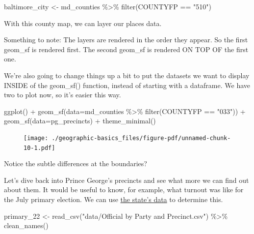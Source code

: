 \documentclass[
  letterpaper,
  DIV=11,
  numbers=noendperiod]{scrreprt}
\newenvironment{Shaded}{\begin{snugshade}}{\end{snugshade}}
\newcommand{\AttributeTok}[1]{\textcolor[rgb]{0.40,0.45,0.13}{#1}}
\newcommand{\FunctionTok}[1]{\textcolor[rgb]{0.28,0.35,0.67}{#1}}
\newcommand{\NormalTok}[1]{\textcolor[rgb]{0.00,0.23,0.31}{#1}}
\newcommand{\OtherTok}[1]{\textcolor[rgb]{0.00,0.23,0.31}{#1}}
\newcommand{\SpecialCharTok}[1]{\textcolor[rgb]{0.37,0.37,0.37}{#1}}
\newcommand{\StringTok}[1]{\textcolor[rgb]{0.13,0.47,0.30}{#1}}
\begin{document}
\begin{Shaded}
\begin{Highlighting}[]
\NormalTok{baltimore\_city }\OtherTok{\textless{}{-}}\NormalTok{ md\_counties }\SpecialCharTok{\%\textgreater{}\%}
  \FunctionTok{filter}\NormalTok{(COUNTYFP }\SpecialCharTok{==} \StringTok{"510"}\NormalTok{)}
\end{Highlighting}
\end{Shaded}

With this county map, we can layer our places data.

Something to note: The layers are rendered in the order they appear. So
the first geom\_sf is rendered first. The second geom\_sf is rendered ON
TOP OF the first one.

We're also going to change things up a bit to put the datasets we want
to display INSIDE of the geom\_sf() function, instead of starting with a
dataframe. We have two to plot now, so it's easier this way.

\begin{Shaded}
\begin{Highlighting}[]
\FunctionTok{ggplot}\NormalTok{() }\SpecialCharTok{+}
  \FunctionTok{geom\_sf}\NormalTok{(}\AttributeTok{data=}\NormalTok{md\_counties }\SpecialCharTok{\%\textgreater{}\%} \FunctionTok{filter}\NormalTok{(COUNTYFP }\SpecialCharTok{==} \StringTok{"033"}\NormalTok{)) }\SpecialCharTok{+}
  \FunctionTok{geom\_sf}\NormalTok{(}\AttributeTok{data=}\NormalTok{pg\_precincts) }\SpecialCharTok{+}
  \FunctionTok{theme\_minimal}\NormalTok{()}
\end{Highlighting}
\end{Shaded}

\begin{figure}[H]

{\centering \texttt{[image: ./geographic-basics\_files/figure-pdf/unnamed-chunk-10-1.pdf]}

}

\end{figure}

Notice the subtle differences at the boundaries?

Let's dive back into Prince George's precincts and see what more we can
find out about them. It would be useful to know, for example, what
turnout was like for the July primary election. We can use
\href{https://elections.maryland.gov/press_room/2022_stats/Official\%20by\%20Party\%20and\%20Precinct.csv}{the
state's data} to determine this.

\begin{Shaded}
\begin{Highlighting}[]
\NormalTok{primary\_22 }\OtherTok{\textless{}{-}} \FunctionTok{read\_csv}\NormalTok{(}\StringTok{"data/Official by Party and Precinct.csv"}\NormalTok{) }\SpecialCharTok{\%\textgreater{}\%} \FunctionTok{clean\_names}\NormalTok{()}
\end{Highlighting}
\end{Shaded}
\end{document}
